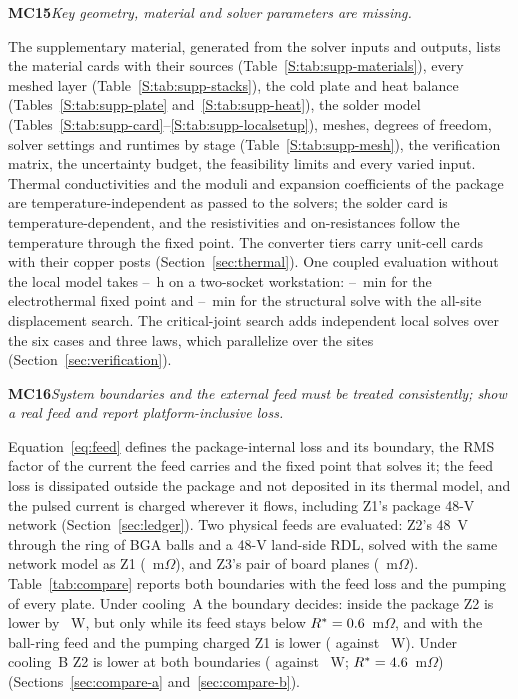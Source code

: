\documentclass[10pt]{article}
\newcommand{\rc}[2]{\par\medskip\noindent\textbf{#1}\enspace\emph{#2}\par\smallskip\noindent}
\begin{document}
\rc{MC15}{Key geometry, material and solver parameters are missing.}
The supplementary material, generated from the solver inputs and outputs, lists the material cards
with their sources (Table~\ref{S:tab:supp-materials}), every meshed layer
(Table~\ref{S:tab:supp-stacks}), the cold plate and heat balance (Tables~\ref{S:tab:supp-plate}
and~\ref{S:tab:supp-heat}), the solder model (Tables~\ref{S:tab:supp-card}--\ref{S:tab:supp-localsetup}),
meshes, degrees of freedom, solver settings and runtimes by stage (Table~\ref{S:tab:supp-mesh}), the
verification matrix, the uncertainty budget, the feasibility limits and every varied input. Thermal
conductivities and the moduli and expansion coefficients of the package are temperature-independent
as passed to the solvers; the solder card is temperature-dependent, and the resistivities and
on-resistances follow the temperature through the fixed point. The converter tiers carry unit-cell
cards with their copper posts (Section~\ref{sec:thermal}). One coupled evaluation without the local
model takes \MthTotHLo--\MthTotHHi~h on a two-socket workstation: \MthEtMinLo--\MthEtMinHi~min for
the electrothermal fixed point and \MthMechMinLo--\MthMechMinHi~min for the structural solve with
the all-site displacement search. The critical-joint search adds \MvCritSolvedAll{} independent local
solves over the six cases and three laws, which parallelize over the sites
(Section~\ref{sec:verification}).

\rc{MC16}{System boundaries and the external feed must be treated consistently; show a real feed and
report platform-inclusive loss.}
Equation~\eqref{eq:feed} defines the package-internal loss and its boundary, the RMS factor of the
current the feed carries and the fixed point that solves it; the feed loss is dissipated outside the
package and not deposited in its thermal model, and the pulsed current is charged wherever it flows,
including Z1's package 48-V network (Section~\ref{sec:ledger}). Two physical feeds are evaluated: Z2's
48~V through the ring of BGA balls and a 48-V land-side RDL, solved with the same network model as Z1
(\FeedRbgaZtwo~m$\Omega$), and Z3's pair of board planes (\FeedRZthree~m$\Omega$).
Table~\ref{tab:compare} reports both boundaries with the feed loss and the pumping of every plate.
Under cooling~A the boundary decides: inside the package Z2 is lower by \GapAZtwo~W, but only while its
feed stays below $R^* = 0.6$~m$\Omega$, and with the ball-ring feed and the pumping charged
Z1 is lower (\PlatAZone{} against \PlatAZtwo~W). Under cooling~B Z2 is lower at both boundaries
(\PlatBZtwo{} against \PlatBZone~W; $R^* = 4.6$~m$\Omega$) (Sections~\ref{sec:compare-a}
and~\ref{sec:compare-b}).
\end{document}

